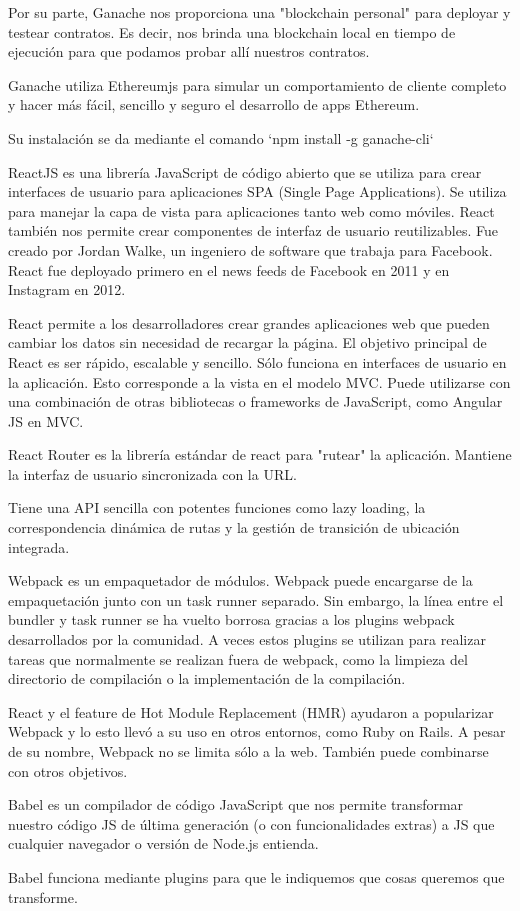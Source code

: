 Por su parte, Ganache nos proporciona una "blockchain personal" para deployar y testear contratos.
Es decir, nos brinda una blockchain local en tiempo de ejecución para que podamos probar allí
nuestros contratos.

Ganache utiliza Ethereumjs para simular un comportamiento de cliente completo y hacer más fácil,
sencillo y seguro el desarrollo de apps Ethereum.

Su instalación se da mediante el comando `npm install -g ganache-cli`

ReactJS es una librería JavaScript de código abierto que se utiliza para crear interfaces de
usuario para aplicaciones SPA (Single Page Applications). Se utiliza para manejar la capa de vista
para aplicaciones tanto web como móviles. React también nos permite crear componentes de interfaz
de usuario reutilizables. Fue creado por Jordan Walke, un ingeniero de software que trabaja para
Facebook. React fue deployado primero en el news feeds de Facebook en 2011 y en Instagram en 2012.
 
React permite a los desarrolladores crear grandes aplicaciones web que pueden cambiar los datos 
sin necesidad de recargar la página. El objetivo principal de React es ser rápido, escalable y
sencillo. Sólo funciona en interfaces de usuario en la aplicación. Esto corresponde a la vista en
el modelo MVC. Puede utilizarse con una combinación de otras bibliotecas o frameworks de
JavaScript, como Angular JS en MVC.


React Router es la librería estándar de react para "rutear" la aplicación. Mantiene la interfaz
de usuario sincronizada con la URL. 

Tiene una API sencilla con potentes funciones como lazy loading, la correspondencia
dinámica de rutas y la gestión de transición de ubicación integrada. 


Webpack es un empaquetador de módulos. Webpack puede encargarse de la empaquetación junto con un
task runner separado. Sin embargo, la línea entre el bundler y task runner se ha vuelto borrosa
gracias a los plugins webpack desarrollados por la comunidad. A veces estos plugins se utilizan
para realizar tareas que normalmente se realizan fuera de webpack, como la limpieza del directorio
de compilación o la implementación de la compilación.

React y el feature de Hot Module Replacement (HMR) ayudaron a popularizar Webpack y lo esto llevó a
su uso en otros entornos, como Ruby on Rails. A pesar de su nombre, Webpack no se limita sólo a la
web. También puede combinarse con otros objetivos.


Babel es un compilador de código JavaScript que nos permite transformar nuestro código JS de última
generación (o con funcionalidades extras) a JS que cualquier navegador o versión de Node.js
entienda.

Babel funciona mediante plugins para que le indiquemos que cosas queremos que transforme.